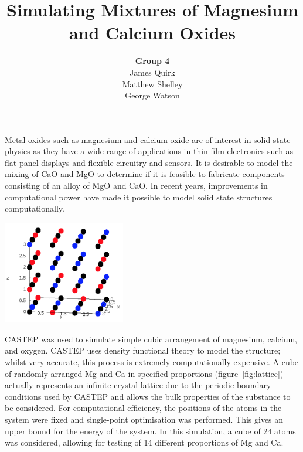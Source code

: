 \documentclass[a4paper,12pt]{article}
\title{Simulating Mixtures of Magnesium and Calcium Oxides}
\author{\textbf{Group 4}\\
	James Quirk\\
	Matthew Shelley\\
	George Watson}
\date{}
\begin{document}
\maketitle

\begin{abstract}
    
\end{abstract}

\begin{multicols}{2}
	
	Metal oxides such as magnesium and calcium oxide are of interest in solid state physics as they have a wide range of applications in thin film electronics such as flat-panel displays and flexible circuitry and sensors.\cite{kim2011lowtemperature} It is desirable to model the mixing of CaO and MgO to determine if it is feasible to fabricate components consisting of an alloy of MgO and CaO. In recent years, improvements in computational power have made it possible to model solid state structures computationally.
	\begin{center}
	    \includegraphics[keepaspectratio=true,width=0.4\textwidth]{lattice}
			\label{fig:lattice} 
	\end{center}
	CASTEP\cite{clark2009first} was used to simulate simple cubic arrangement of magnesium, calcium, and oxygen. CASTEP uses density functional theory to model the structure; whilst very accurate, this process is extremely computationally expensive. A cube of randomly-arranged Mg and Ca in specified proportions (figure~\ref{fig:lattice}) actually represents an infinite crystal lattice due to the periodic boundary conditions used by CASTEP and allows the bulk properties of the substance to be considered. For computational efficiency, the positions of the atoms in the system were fixed and single-point optimisation was performed. This gives an upper bound for the energy of the system. In this simulation, a cube of 24 atoms was considered, allowing for testing of 14 different proportions of Mg and Ca. 
	

\end{multicols}
\end{document}
